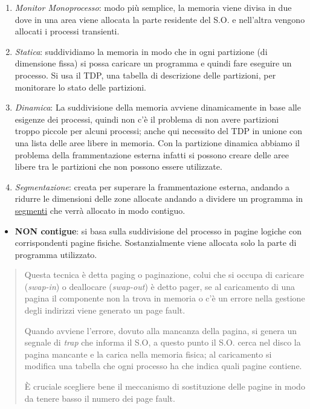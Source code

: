 \begin{enumerate}
\def\labelenumi{\arabic{enumi}.}
\item
  \emph{Monitor Monoprocesso}: modo più semplice, la memoria viene
  divisa in due dove in una area viene allocata la parte residente del
  S.O. e nell'altra vengono allocati i processi transienti.
\item
  \emph{Statica}: suddividiamo la memoria in modo che in ogni partizione
  (di dimensione fissa) si possa caricare un programma e quindi fare
  eseguire un processo. Si usa il TDP, una tabella di descrizione delle
  partizioni, per monitorare lo stato delle partizioni.
\item
  \emph{Dinamica}: La suddivisione della memoria avviene dinamicamente
  in base alle esigenze dei processi, quindi non c'è il problema di non
  avere partizioni troppo piccole per alcuni processi; anche qui
  necessito del TDP in unione con una lista delle aree libere in
  memoria. Con la partizione dinamica abbiamo il problema della
  frammentazione esterna infatti si possono creare delle aree libere tra
  le partizioni che non possono essere utilizzate.
\item
  \emph{Segmentazione}: creata per superare la frammentazione esterna,
  andando a ridurre le dimensioni delle zone allocate andando a dividere
  un programma in \ul{segmenti} che verrà allocato in modo contiguo.
\end{enumerate}

\begin{itemize}
\item
  \textbf{NON contigue}: si basa sulla suddivisione del processo in
  pagine logiche con corrispondenti pagine fisiche. Sostanzialmente
  viene allocata solo la parte di programma utilizzato.
\end{itemize}

\begin{quote}
Questa tecnica è detta paging o paginazione, colui che si occupa di
caricare (\emph{swap-in}) o deallocare (\emph{swap-out}) è detto pager,
se al caricamento di una pagina il componente non la trova in memoria o
c'è un errore nella gestione degli indirizzi viene generato un page
fault.

Quando avviene l'errore, dovuto alla mancanza della pagina, si genera un
segnale di \emph{trap} che informa il S.O, a questo punto il S.O. cerca
nel disco la pagina mancante e la carica nella memoria fisica; al
caricamento si modifica una tabella che ogni processo ha che indica
quali pagine contiene.

È cruciale scegliere bene il meccanismo di sostituzione delle pagine in
modo da tenere basso il numero dei page fault.
\end{quote}

